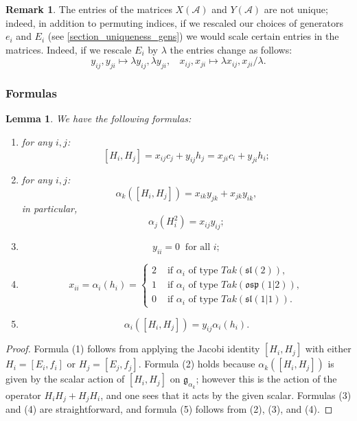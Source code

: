 \documentclass[12pt, a4paper, reqno]{amsart}
\def\AA{\mathcal{A}}
\def\p{\mathfrak{p}}
\def\g{\mathfrak{g}}
\def\l{\mathfrak{l}}
\def\s{\mathfrak{s}}
\def\o{\mathfrak{o}}
\newtheorem{lemma}{Lemma}
\theoremstyle{definition}
\theoremstyle{definition}
\newtheorem{remark}{Remark}
\theoremstyle{definition}
\numberwithin{theorem}{section}
\numberwithin{lemma}{section}
\numberwithin{remark}{section}
\numberwithin{definition}{section}
\numberwithin{corollary}{section}
\numberwithin{proposition}{section}
\numberwithin{example}{section}
\begin{document}
	\begin{remark}\label{remark_rescaling}
		The entries of the matrices $X(\AA)$ and $Y(\AA)$ are not unique; indeed, in addition to permuting indices, if we rescaled our choices of generators $e_i$ and $E_i$ (see \ref{section_uniqueness_gens}) we would scale certain entries in the matrices. Indeed, if we rescale $E_i$ by $\lambda$ the entries change as follows:
		\[
		y_{ij},y_{ji}\mapsto \lambda y_{ij},\lambda y_{ji}, \ \ \ \ x_{ij},x_{ji}\mapsto\lambda x_{ij},x_{ji}/\lambda.
		\]
	\end{remark}
	
	
	\subsubsection{Formulas}	
	\begin{lemma}\label{lemma_QKM_formulas}
		We have the following formulas:
		\begin{enumerate}
			\item for any $i,j$:
			\[
			[H_i,H_j]=x_{ij}c_j+y_{ij}h_j = x_{ji}c_i+y_{ji}h_i;
			\]
			\item for any $i,j$:
			\[
			\alpha_k([H_i,H_j])=x_{ik}y_{jk} + x_{jk}y_{ik},
			\]
			in particular,
			\[
			\alpha_j(H_i^2)=x_{ij}y_{ij};
			\]
			\item 
			\[
			y_{ii}=0 \ \text{ for all }i;
			\]
			\item 
			\[
			x_{ii}=\alpha_i(h_i)=\begin{cases}
				2 & \text{ if }\alpha_i\text{ of type }Tak(\s\l(2)),\\
				1 & \text{ if }\alpha_i\text{ of type }Tak(\o\s\p(1|2)),\\
				0 & \text{ if }\alpha_i\text{ of type }Tak(\s\l(1|1)).
			\end{cases}
			\]
			\item 
			\[
			\alpha_i([H_i,H_j])=y_{ij}\alpha_i(h_i).
			\]
		\end{enumerate}
	\end{lemma}
	\begin{proof}
		Formula (1) follows from applying the Jacobi identity $[H_i,H_j]$ with either $H_i=[E_i,f_i]$ or $H_j=[E_j,f_j]$.  Formula (2) holds because $\alpha_k([H_i,H_j])$ is given by the scalar action of $[H_i,H_j]$ on $\g_{\alpha_k}$; however this is the action of the operator $H_iH_j+H_jH_i$, and one sees that it acts by the given scalar.  Formulas (3) and (4) are straightforward, and formula (5) follows from (2), (3), and (4).
	\end{proof}
	
\end{document}
